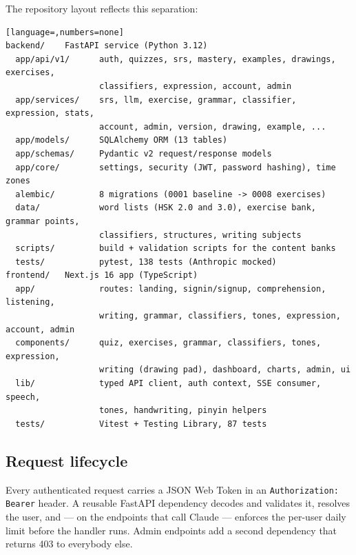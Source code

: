 \documentclass[11pt,a4paper]{article}
\begin{document}
\noindent The repository layout reflects this separation:

\begin{lstlisting}[language=,numbers=none]
backend/    FastAPI service (Python 3.12)
  app/api/v1/      auth, quizzes, srs, mastery, examples, drawings, exercises,
                   classifiers, expression, account, admin
  app/services/    srs, llm, exercise, grammar, classifier, expression, stats,
                   account, admin, version, drawing, example, ...
  app/models/      SQLAlchemy ORM (13 tables)
  app/schemas/     Pydantic v2 request/response models
  app/core/        settings, security (JWT, password hashing), time zones
  alembic/         8 migrations (0001 baseline -> 0008 exercises)
  data/            word lists (HSK 2.0 and 3.0), exercise bank, grammar points,
                   classifiers, structures, writing subjects
  scripts/         build + validation scripts for the content banks
  tests/           pytest, 138 tests (Anthropic mocked)
frontend/   Next.js 16 app (TypeScript)
  app/             routes: landing, signin/signup, comprehension, listening,
                   writing, grammar, classifiers, tones, expression, account, admin
  components/      quiz, exercises, grammar, classifiers, tones, expression,
                   writing (drawing pad), dashboard, charts, admin, ui
  lib/             typed API client, auth context, SSE consumer, speech,
                   tones, handwriting, pinyin helpers
  tests/           Vitest + Testing Library, 87 tests
\end{lstlisting}

\subsection{Request lifecycle}

Every authenticated request carries a JSON Web Token in an
\texttt{Authorization: Bearer} header. A reusable FastAPI dependency decodes
and validates it, resolves the user, and --- on the endpoints that call Claude
--- enforces the per-user daily limit before the handler runs. Admin endpoints
add a second dependency that returns 403 to everybody else.
\end{document}
